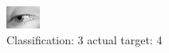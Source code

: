 \begin{figure}[h!]
\begin{center}
\includegraphics[width=0.60\columnwidth]{figures/ID3025_class_3_target_4.png}
\end{center}
\caption{ Classification: 3 actual target: 4}
\label{fig:ID3025_class_3_target_4}
\end{figure}
